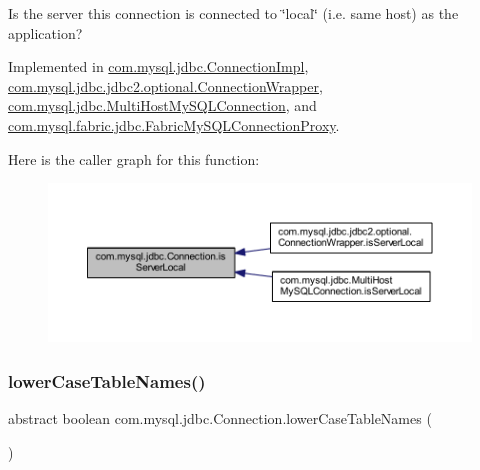 Is the server this connection is connected to \char`\"{}local\char`\"{} (i.\+e. same host) as the application? 

Implemented in \mbox{\hyperlink{classcom_1_1mysql_1_1jdbc_1_1_connection_impl_a88cfb69a36df841dccfba314da816213}{com.\+mysql.\+jdbc.\+Connection\+Impl}}, \mbox{\hyperlink{classcom_1_1mysql_1_1jdbc_1_1jdbc2_1_1optional_1_1_connection_wrapper_a7361ebd235ec5eb1608231e3b9d4eb36}{com.\+mysql.\+jdbc.\+jdbc2.\+optional.\+Connection\+Wrapper}}, \mbox{\hyperlink{classcom_1_1mysql_1_1jdbc_1_1_multi_host_my_s_q_l_connection_a044d7bf7d1701e6102dfd2d0c88be318}{com.\+mysql.\+jdbc.\+Multi\+Host\+My\+S\+Q\+L\+Connection}}, and \mbox{\hyperlink{classcom_1_1mysql_1_1fabric_1_1jdbc_1_1_fabric_my_s_q_l_connection_proxy_a8ed4333a3f7243ba6460b94c5fa204d4}{com.\+mysql.\+fabric.\+jdbc.\+Fabric\+My\+S\+Q\+L\+Connection\+Proxy}}.

Here is the caller graph for this function\+:\nopagebreak
\begin{figure}[H]
\begin{center}
\leavevmode
\includegraphics[width=350pt]{interfacecom_1_1mysql_1_1jdbc_1_1_connection_a37eb25137505b9aaf4b25a847f87e949_icgraph}
\end{center}
\end{figure}
\mbox{\label{interfacecom_1_1mysql_1_1jdbc_1_1_connection_a18c9cf0dc2d7ca1f69a3435eb4dbfde2}} 
\subsubsection{\texorpdfstring{lower\+Case\+Table\+Names()}{lowerCaseTableNames()}}
{\footnotesize\ttfamily abstract boolean com.\+mysql.\+jdbc.\+Connection.\+lower\+Case\+Table\+Names (\begin{DoxyParamCaption}{ }\end{DoxyParamCaption})\hspace{0.3cm}{\ttfamily [abstract]}}

